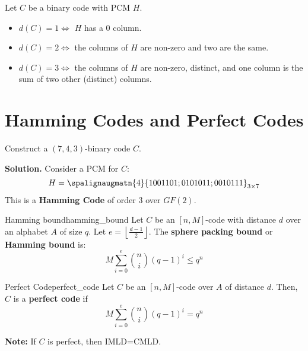 \begin{Example}{}{}
    Let $ C $ be a binary code with PCM $ H $.
    \begin{itemize}
        \item $ d(C)=1\iff  $ $ H $ has a $ 0 $ column.
        \item $ d(C)=2\iff $ the columns of $ H $ are non-zero and two are
              the same.
        \item $ d(C)=3\iff $ the columns of $ H $ are non-zero, distinct, and one
              column is the sum of two other (distinct) columns.
    \end{itemize}
\end{Example}

\section{Hamming Codes and Perfect Codes}

\begin{Example}{}{}
    Construct a $ (7,4,3) $-binary code $ C $.

    \textbf{Solution.}
    Consider a PCM for $ C $:
    \[H= \spalignaugmatn{4}{
            1 0 0 1 1 0 1;
            0 1 0 1 0 1 1;
            0 0 1 0 1 1 1}_{3\times{} 7} \]
    This is a \textbf{Hamming Code} of order $ 3 $ over $ GF(2) $.
\end{Example}

\begin{Definition}{Hamming bound}{hamming_bound}
    Let $ C $ be an $ [n,M] $-code with distance $ d $ over an
    alphabet $ A $ of size $ q $. Let $ e=\left\lfloor \frac{d-1}{2} \right\rfloor $.
    The \textbf{sphere packing bound} or \textbf{Hamming bound} is:
    \[ M \sum\limits_{i=0}^{e} \binom{n}{i}(q-1)^i\leqslant q^n \]
\end{Definition}

\begin{Definition}{Perfect Code}{perfect_code}
    Let $ C $ be an $ [n,M] $-code over $ A $ of distance $ d $. Then,
    $ C $ is a \textbf{perfect code} if
    \[ M \sum\limits_{i=0}^{e} \binom{n}{i}(q-1)^i = q^n \]
\end{Definition}

\textbf{Note:} If $ C $ is perfect, then IMLD=CMLD\@.

